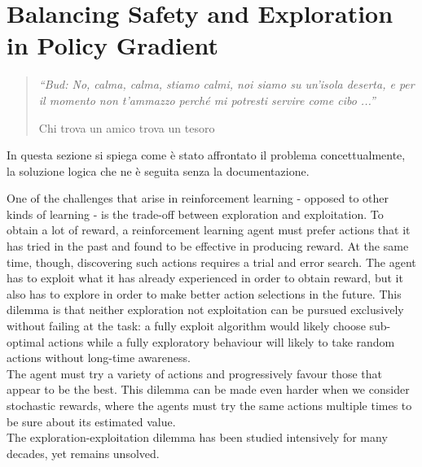\chapter{Balancing Safety and Exploration in Policy Gradient}
\label{ch:balance}
\thispagestyle{empty}

\begin{quotation}
{\footnotesize
\noindent \emph{``Bud: No, calma, calma, stiamo calmi, noi siamo su un'isola deserta, e per il momento non t'ammazzo perch\'e mi potresti servire come cibo ...''}
\begin{flushright}
Chi trova un amico trova un tesoro
\end{flushright}
}
\end{quotation}
\vspace{0.5cm}

\noindent In questa sezione si spiega come \`e stato affrontato il problema concettualmente, la soluzione logica che ne \`e seguita senza la documentazione.






One of the challenges that arise in reinforcement learning - opposed to other kinds of learning - is the trade-off between exploration and exploitation. To obtain a lot of reward, a reinforcement learning agent must prefer actions that it has tried in the past and found to be effective in producing reward. At the same time, though, discovering such actions requires a trial and error search. The agent has to exploit what it has already experienced in order to obtain reward, but it also has to explore in order to make better action selections in the future. This dilemma is that neither exploration not exploitation can be pursued exclusively without failing at the task: a fully exploit algorithm would likely choose sub-optimal actions while a fully exploratory behaviour will likely to take random actions without long-time awareness.\\
The agent must try a variety of actions and progressively favour those that appear to be the best. This dilemma can be made even harder when we consider stochastic rewards, where the agents must try the same actions multiple times to be sure about its estimated value. \\
The exploration-exploitation dilemma has been studied intensively for many decades, yet remains unsolved.